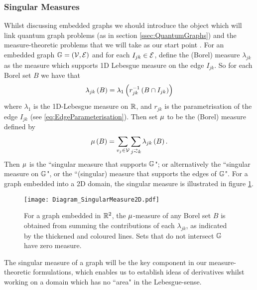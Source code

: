 \subsubsection{Singular Measures} \label{sssec:SingularMeasures}
Whilst discussing embedded graphs we should introduce the object which will link quantum graph problems (as in section \ref{ssec:QuantumGraphs}) and the measure-theoretic problems that we will take as our start point .
For an embedded graph $\mathbb{G} = \left( \mathcal{V},\mathcal{E} \right)$ and for each $I_{jk}\in \mathcal{E}$, define the (Borel) measure $\lambda_{jk}$ as the measure which supports 1D Lebesgue measure on the edge $I_{jk}$.
So for each Borel set $B$ we have that 
\begin{align*}
	\lambda_{jk}\left( B \right) = \lambda_{1}\left( r_{jk}^{-1}\left( B \cap I_{jk} \right) \right)
\end{align*}
where $\lambda_1$ is the 1D-Lebesgue measure on $\mathbb{R}$, and $r_{jk}$ is the parametrisation of the edge $I_{jk}$ (see \eqref{eq:EdgeParameterisation}).
Then set $\mu$ to be the (Borel) measure defined by
\begin{align*}
	\ddmes\bracs{B} = \sum_{v_j\in \vertSet}\sum_{j\conLeft k} \lambda_{jk}\bracs{B}.
\end{align*}
Then $\mu$ is the ``singular measure that supports $\mathbb{G}$"; or alternatively the ``singular measure on $\mathbb{G}$", or the ``(singular) measure that supports the edges of $\mathbb{G}$". 
For a graph embedded into a 2D domain, the singular measure is illustrated in figure \ref{fig:Diagram_SingularMeasure2D}.
\begin{figure}[t!]
	\centering
	\texttt{[image: Diagram\_SingularMeasure2D.pdf]}
	\caption{\label{fig:Diagram_SingularMeasure2D} For a graph embedded in $\mathbb{R}^2$, the $\mu$-measure of any Borel set $B$ is obtained from summing the contributions of each $\lambda_{jk}$, as indicated by the thickened and coloured lines.
	Sets that do not intersect $\mathbb{G}$ have zero measure.}
\end{figure} \newline

The singular measure of a graph will be the key component in our measure-theoretic formulations, which enables us to establish ideas of derivatives whilst working on a domain which has no ``area" in the Lebesgue-sense.

